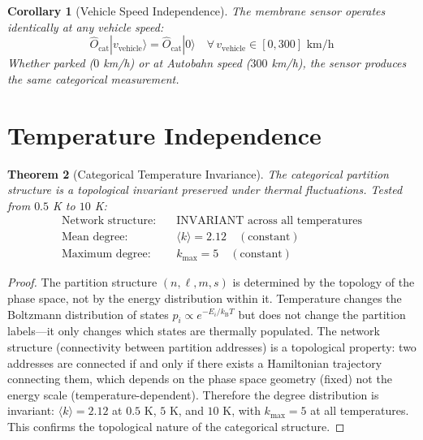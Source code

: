 \documentclass[twocolumn,10pt,a4paper]{article}
\newtheorem{theorem}{Theorem}[section]
\newtheorem{corollary}[theorem]{Corollary}
\theoremstyle{definition}
\theoremstyle{remark}
\newcommand{\Ocat}{\hat{O}_{\mathrm{cat}}}
\newcommand{\kB}{k_{\mathrm{B}}}
\begin{document}
\begin{corollary}[Vehicle Speed Independence]
\label{cor:vehicle}
The membrane sensor operates identically at any vehicle speed:
\begin{equation}
\label{eq:vehicle_speed}
\Ocat |v_{\mathrm{vehicle}}\rangle = \Ocat |0\rangle \quad \forall \, v_{\mathrm{vehicle}} \in [0, 300] \text{ km/h}
\end{equation}
Whether parked ($0$ km/h) or at Autobahn speed ($300$ km/h), the sensor produces the same categorical measurement.
\end{corollary}


\section{Temperature Independence}
\label{sec:temperature}

\begin{theorem}[Categorical Temperature Invariance]
\label{thm:temperature}
The categorical partition structure is a topological invariant preserved under thermal fluctuations. Tested from $0.5$ K to $10$ K:
\begin{align}
\text{Network structure:} &\quad \text{INVARIANT across all temperatures} \label{eq:temp_invariant} \\
\text{Mean degree:} &\quad \langle k \rangle = 2.12 \quad (\text{constant}) \label{eq:mean_degree} \\
\text{Maximum degree:} &\quad k_{\mathrm{max}} = 5 \quad (\text{constant}) \label{eq:max_degree}
\end{align}
\end{theorem}

\begin{proof}
The partition structure $(n, \ell, m, s)$ is determined by the topology of the phase space, not by the energy distribution within it. Temperature changes the Boltzmann distribution of states $p_i \propto e^{-E_i/\kB T}$ but does not change the partition labels---it only changes which states are thermally populated. The network structure (connectivity between partition addresses) is a topological property: two addresses are connected if and only if there exists a Hamiltonian trajectory connecting them, which depends on the phase space geometry (fixed) not the energy scale (temperature-dependent). Therefore the degree distribution is invariant: $\langle k \rangle = 2.12$ at $0.5$ K, $5$ K, and $10$ K, with $k_{\mathrm{max}} = 5$ at all temperatures. This confirms the topological nature of the categorical structure. \qedhere
\end{proof}
\end{document}

